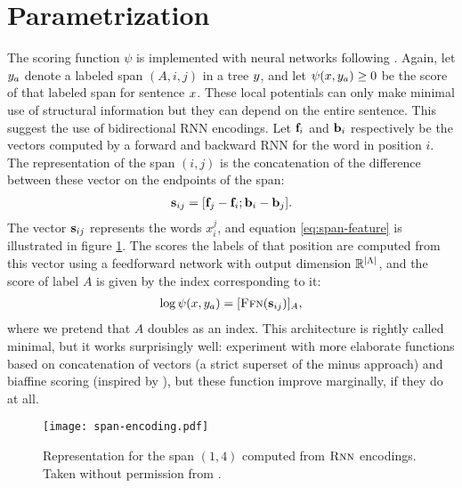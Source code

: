 \section{Parametrization}
  The scoring function $\psi$ is implemented with neural networks following \citet{stern2017minimal}. Again, let $y_a$ denote a labeled span $(A, i, j)$ in a tree $y$, and let $\psi(x, y_a) \geq 0$ be the score of that labeled span for sentence $x$. These local potentials can only make minimal use of structural information but they can depend on the entire sentence. This suggest the use of bidirectional RNN encodings. Let $\mathbf{f}_i$ and $\mathbf{b}_i$ respectively be the vectors computed by a forward and backward RNN for the word in position $i$. The representation of the span $(i, j)$ is the concatenation of the difference between these vector on the endpoints of the span:
  \begin{align}
    \label{eq:span-feature}
    \mathbf{s}_{ij} = [\mathbf{f}_j - \mathbf{f}_i; \mathbf{b}_i - \mathbf{b}_j].
  \end{align}
  The vector $\mathbf{s}_{ij}$ represents the words $x_i^j$, and equation \ref{eq:span-feature} is illustrated in figure \ref{fig:span-feature}. The scores the labels of that position are computed from this vector using a feedforward network with output dimension $\mathbb{R}^{\lvert \Lambda \rvert}$, and the score of label $A$ is given by the index corresponding to it:
  \begin{align}
    \label{eq:potential-function}
    \log \psi(x, y_a) = [ \textsc{Ffn}( \mathbf{s}_{ij} ) ]_{A},
  \end{align}
  where we pretend that $A$ doubles as an index. This architecture is rightly called minimal, but it works surprisingly well: \citet{stern2017minimal} experiment with more elaborate functions based on concatenation of vectors (a strict superset of the minus approach) and biaffine scoring (inspired by \citet{dozat2016deep}), but these function improve marginally, if they do at all.

  \begin{figure}
    \texttt{[image: span-encoding.pdf]}
    \caption{Representation for the span $(1, 4)$ computed from $\textsc{Rnn}$ encodings. Taken without permission from \citet{stern2018analyis}.}
    \label{fig:span-feature}
  \end{figure}


